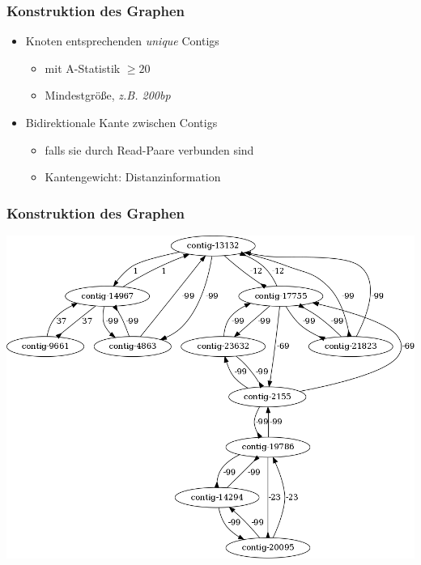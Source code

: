 \documentclass[xcolor=pst]{beamer}
\begin{document}
\begin{frame}
  \frametitle{Konstruktion des Graphen}
  \begin{itemize}
    \item Knoten entsprechenden \textit{unique} Contigs
    \begin{itemize}
      \item mit A-Statistik $\geq 20$
      \item Mindestgröße, \textit{z.B. 200bp}
    \end{itemize}
    \item Bidirektionale Kante zwischen Contigs
    \begin{itemize}
      \item falls sie durch Read-Paare verbunden sind
      \item Kantengewicht: Distanzinformation
    \end{itemize}
  \end{itemize}
\end{frame}

\begin{frame}
  \frametitle{Konstruktion des Graphen}
  \begin{center}
    \includegraphics[scale=0.25]{figures/s_cerevisiae_parsed_graph_example_small.png}
  \end{center}
\end{frame}
\end{document}
